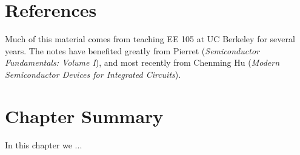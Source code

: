 \section{References}
Much of this material comes from teaching EE 105 at UC Berkeley for several years.  The notes have benefited greatly from Pierret\cite{pierret} (\emph{Semiconductor Fundamentals: Volume I}), and most recently from Chenming Hu\cite{hu} (\emph{Modern Semiconductor Devices for Integrated Circuits}).
\newpage
\section{Chapter Summary}
In this chapter we ...

